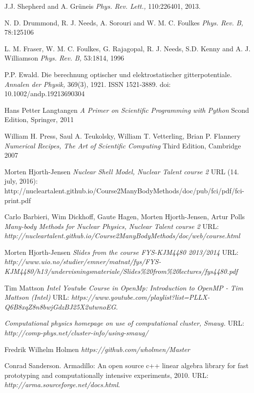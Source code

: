 \documentclass[twoside,english]{uiofysmaster}
\begin{document}
\begin{thebibliography}{9}
	J.J. Shepherd and A. Grüneis
	\textit{Phys. Rev. Lett.,} 110:226401, 2013.

	N. D. Drummond, R. J. Needs, A. Sorouri and W. M. C. Foulkes
	\textit{Phys. Rev. B,} 78:125106

	L. M. Fraser, W. M. C. Foulkes, G. Rajagopal, R. J. Needs, S.D. Kenny and A. J. Williamson
	\textit{Phys. Rev. B,} 53:1814, 1996

	P.P. Ewald. Die berechnung optischer und elektrostatischer gitterpotentiale. 
	\textit{Annalen der Physik,} 369(3), 1921. ISSN 1521-3889. doi: 10.1002/andp.19213690304

	Hans Petter Langtangen
	\textit{A Primer on Scientific Programming with Python} Scond Edition, Springer, 2011

	William H. Press, Saul A. Teukolsky, William T. Vetterling, Brian P. Flannery
	\textit{Numerical Recipes, The Art of Scientific Computing} Third Edition, Cambridge 2007

	Morten Hjorth-Jensen
	\textit{Nuclear Shell Model, Nuclear Talent course 2} 
	URL (14. july, 2016): http://nucleartalent.github.io/Course2ManyBodyMethods/doc/pub/fci/pdf/fci-print.pdf

	Carlo Barbieri, Wim Dickhoff, Gaute Hagen, Morten Hjorth-Jensen, Artur Polls
	\textit{Many-body Methods for Nuclear Physics, Nuclear Talent course 2} 
	URL: \textit{http://nucleartalent.github.io/Course2ManyBodyMethods/doc/web/course.html}

	Morten Hjorth-Jensen
	\textit{Slides from the course FYS-KJM4480 2013/2014}
	URL: \textit{http://www.uio.no/studier/emner/matnat/fys/FYS-KJM4480/h13/undervisningsmateriale/Slides\%20from\%20lectures/fys4480.pdf}

	Tim Mattson
	\textit{Intel Youtube Course in OpenMp: Introduction to OpenMP - Tim Mattson (Intel)}
	URL: \textit{https://www.youtube.com/playlist?list=PLLX-Q6B8xqZ8n8bwjGdzBJ25X2utwnoEG}.

	\textit{Computational physics homepage on use of computational cluster, Smaug.}
	URL: \textit{http://comp-phys.net/cluster-info/using-smaug/}

	Fredrik Wilhelm Holmen
	\textit{https://github.com/wholmen/Master} 

	Conrad Sanderson. Armadillo: An open source c++ linear algebra library for fast prototyping and computationally intensive experiments, 2010.
	URL: \textit{http://arma.sourceforge.net/docs.html}.

\end{thebibliography}
\end{document}
